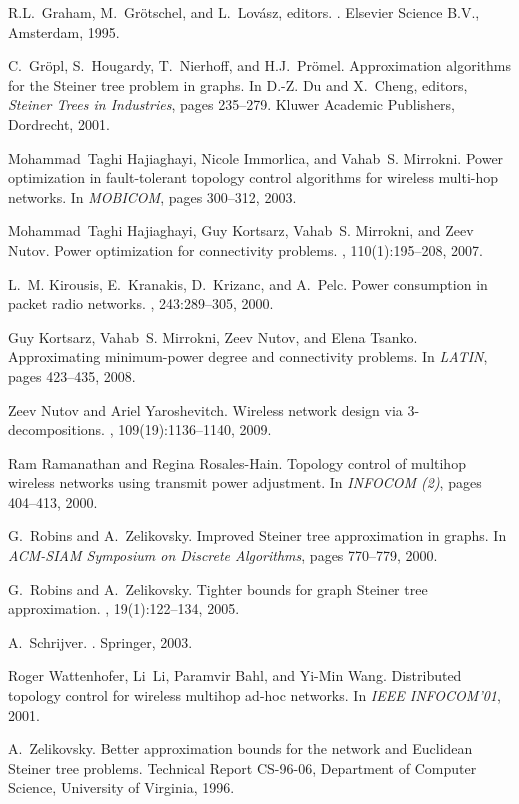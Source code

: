 \documentclass[12pt]{article}
\begin{document}
\begin{thebibliography}{10}
R.L.\ Graham, M.\ Gr{\"o}tschel, and L.\ Lov{\'a}sz, editors.
.
\newblock Elsevier Science B.V., Amsterdam, 1995.

C.\ Gr\"opl, S.\ Hougardy, T.\ Nierhoff, and H.J.\ Pr\"omel.
\newblock Approximation algorithms for the {S}teiner tree problem in graphs.
\newblock In D.-Z. Du and X.~Cheng, editors, {\em Steiner Trees in Industries},
  pages 235--279. Kluwer Academic Publishers, Dordrecht, 2001.

Mohammad~Taghi Hajiaghayi, Nicole Immorlica, and Vahab~S. Mirrokni.
\newblock Power optimization in fault-tolerant topology control algorithms for
  wireless multi-hop networks.
\newblock In {\em MOBICOM}, pages 300--312, 2003.

Mohammad~Taghi Hajiaghayi, Guy Kortsarz, Vahab~S. Mirrokni, and Zeev Nutov.
\newblock Power optimization for connectivity problems.
, 110(1):195--208, 2007.

L.~M. Kirousis, E.~Kranakis, D.~Krizanc, and A.~Pelc.
\newblock Power consumption in packet radio networks.
, 243:289--305, 2000.

Guy Kortsarz, Vahab~S. Mirrokni, Zeev Nutov, and Elena Tsanko.
\newblock Approximating minimum-power degree and connectivity problems.
\newblock In {\em LATIN}, pages 423--435, 2008.

Zeev Nutov and Ariel Yaroshevitch.
\newblock Wireless network design via 3-decompositions.
, 109(19):1136--1140, 2009.

Ram Ramanathan and Regina Rosales-Hain.
\newblock Topology control of multihop wireless networks using transmit power
  adjustment.
\newblock In {\em {INFOCOM} (2)}, pages 404--413, 2000.

G.~Robins and A.~Zelikovsky.
\newblock Improved {Steiner} tree approximation in graphs.
\newblock In {\em ACM-SIAM Symposium on Discrete Algorithms}, pages 770--779,
  2000.

G.\ Robins and A.\ Zelikovsky.
\newblock Tighter bounds for graph {S}teiner tree approximation.
, 19(1):122--134, 2005.

A.~Schrijver.
.
\newblock Springer, 2003.

Roger Wattenhofer, Li~Li, Paramvir Bahl, and Yi-Min Wang.
\newblock Distributed topology control for wireless multihop ad-hoc networks.
\newblock In {\em IEEE INFOCOM'01}, 2001.

A.~Zelikovsky.
\newblock Better approximation bounds for the network and {Euclidean} {Steiner}
  tree problems.
\newblock Technical Report CS-96-06, Department of Computer Science, University
  of Virginia, 1996.

\end{thebibliography}
\end{document}
